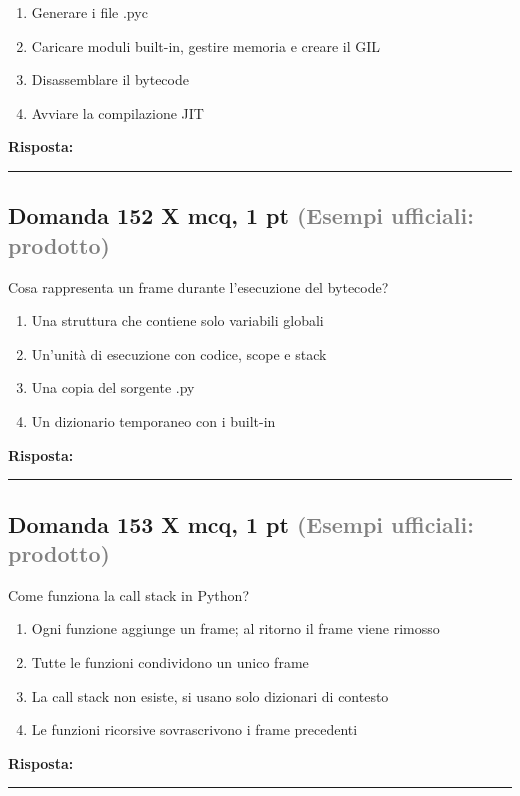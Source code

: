 \documentclass[a4paper,11pt]{article}
\begin{document}
\begin{enumerate}[label=\alph*)]
\item Generare i file .pyc
\item Caricare moduli built-in, gestire memoria e creare il GIL
\item Disassemblare il bytecode
\item Avviare la compilazione JIT
\end{enumerate}
\vspace{0.2cm}
\noindent\textbf{Risposta:}\par
\vspace{1.5cm}\hrule


\subsection*{Domanda 152 X \hfill {\small mcq, 1 pt \textcolor{gray}{(Esempi ufficiali: prodotto)}}}
Cosa rappresenta un frame durante l'esecuzione del bytecode?

\begin{enumerate}[label=\alph*)]
\item Una struttura che contiene solo variabili globali
\item Un'unità di esecuzione con codice, scope e stack
\item Una copia del sorgente .py
\item Un dizionario temporaneo con i built-in
\end{enumerate}
\vspace{0.2cm}
\noindent\textbf{Risposta:}\par
\vspace{1.5cm}\hrule


\subsection*{Domanda 153 X \hfill {\small mcq, 1 pt \textcolor{gray}{(Esempi ufficiali: prodotto)}}}
Come funziona la call stack in Python?

\begin{enumerate}[label=\alph*)]
\item Ogni funzione aggiunge un frame; al ritorno il frame viene rimosso
\item Tutte le funzioni condividono un unico frame
\item La call stack non esiste, si usano solo dizionari di contesto
\item Le funzioni ricorsive sovrascrivono i frame precedenti
\end{enumerate}
\vspace{0.2cm}
\noindent\textbf{Risposta:}\par
\vspace{1.5cm}\hrule
\end{document}
